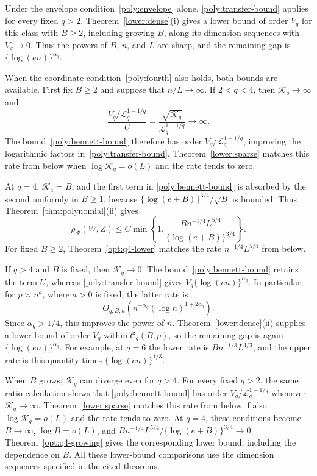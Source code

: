 \documentclass[11pt,letterpaper]{article}
\newenvironment{recovered}{}{}
\theoremstyle{remark}
\newcommand{\rh}{\rho_{\mathcal R}}
\begin{document}
\begin{recovered}
Under the envelope condition~\eqref{poly:envelope} alone,
\eqref{poly:transfer-bound} applies for every fixed \(q>2\).
Theorem~\ref{lower:dense}\textup{(i)} gives a lower bound of order
\(V_q\) for this class with \(B\ge2\), including growing \(B\),
along its dimension sequences with \(V_q\to0\). Thus the powers of \(B\), \(n\),
and \(L\) are sharp, and the remaining gap is
\(\{\log(en)\}^{\alpha_q}\).

When the coordinate condition~\eqref{poly:fourth} also holds, both
bounds are available. First fix \(B\ge2\) and suppose that
\(n/L\to\infty\). If \(2<q<4\), then \(\mathcal K_q\to\infty\)
and
\[
 \frac{V_q/\mathcal L_q^{1-1/q}}{U}
   =\frac{\sqrt{\mathcal K_q}}{\mathcal L_q^{1-1/q}}\longrightarrow\infty.
\]
The bound~\eqref{poly:bennett-bound} therefore has order
\(V_q/\mathcal L_q^{1-1/q}\), improving the logarithmic factors
in~\eqref{poly:transfer-bound}. Theorem~\ref{lower:sparse} matches
this rate from below when \(\log\mathcal K_q=o(L)\) and the rate
tends to zero.

At \(q=4\), \(\mathcal K_4=B\), and the first term in
\eqref{poly:bennett-bound} is absorbed by the second uniformly in \(B\ge1\),
because \(\{\log(e+B)\}^{3/4}/\sqrt B\) is bounded.
Thus Theorem~\ref{thm:polynomial}\textup{(ii)} gives
\begin{equation}
 \rh(W,Z)\le C\min\left\{1,
 \frac{Bn^{-1/4}L^{5/4}}{\{\log(e+B)\}^{3/4}}\right\}.
 \label{poly:q4}
\end{equation}
For fixed \(B\ge2\), Theorem~\ref{opt:q4-lower} matches the rate
\(n^{-1/4}L^{5/4}\) from below.

If \(q>4\) and \(B\) is fixed, then \(\mathcal K_q\to0\).
The bound~\eqref{poly:bennett-bound} retains the term \(U\), whereas
\eqref{poly:transfer-bound} gives \(V_q\{\log(en)\}^{\alpha_q}\).
In particular, for \(p\asymp n^a\), where \(a>0\) is fixed,
the latter rate is
\[
 O_{q,B,a}\!\left(n^{-\alpha_q}(\log n)^{1+2\alpha_q}\right).
\]
Since \(\alpha_q>1/4\), this improves the power of \(n\).
Theorem~\ref{lower:dense}\textup{(ii)} supplies a lower bound of order
\(V_q\) within \(\mathcal C_q(B,p)\), so the remaining gap is again
\(\{\log(en)\}^{\alpha_q}\). For example, at \(q=6\) the lower
rate is \(Bn^{-1/3}L^{4/3}\), and the upper rate is this quantity
times \(\{\log(en)\}^{1/3}\).

When \(B\) grows, \(\mathcal K_q\) can diverge even for \(q>4\).
For every fixed \(q>2\), the same ratio calculation shows that
\eqref{poly:bennett-bound} has order \(V_q/\mathcal L_q^{1-1/q}\)
whenever \(\mathcal K_q\to\infty\). Theorem~\ref{lower:sparse}
matches this rate from below if also \(\log\mathcal K_q=o(L)\)
and the rate tends to zero. At \(q=4\), these conditions become
\(B\to\infty\), \(\log B=o(L)\), and
\(Bn^{-1/4}L^{5/4}/\{\log(e+B)\}^{3/4}\to0\).
Theorem~\ref{opt:q4-growing} gives the corresponding lower bound,
including the dependence on \(B\). All these lower-bound comparisons
use the dimension sequences specified in the cited theorems.
\end{recovered}
\end{document}
